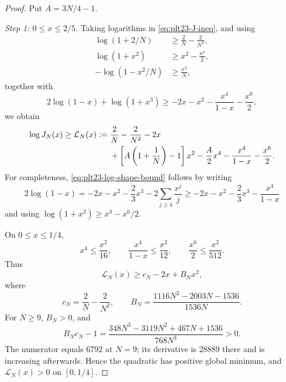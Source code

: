 \documentclass[11pt]{article}
\numberwithin{equation}{section}
\begin{document}
\begin{proof}
  Put $A=3N/4-1$.

  \smallskip
  \noindent\emph{Step 1: $0\le x\le2/5$.}
  Taking logarithms in \eqref{eq:plt23-J-ineq}, and using
  \begin{align*}
    \log(1+2/N)&\ge\frac{2}{N}-\frac{2}{N^2},\\
    \log(1+x^2)&\ge x^2-\frac{x^4}{2},\\
    -\log(1-x^2/N)&\ge\frac{x^2}{N},
  \end{align*}
  together with
  \begin{equation}\label{eq:plt23-log-shape-bound}
    2\log(1-x)+\log(1+x^3)
    \ge-2x-x^2-\frac{x^4}{1-x}-\frac{x^6}{2},
  \end{equation}
  we obtain
  \begin{align}
    \log J_N(x)\ge\mathcal L_N(x):={}&
    \frac{2}{N}-\frac{2}{N^2}-2x \notag\\
    &+\left[A\left(1+\frac{1}{N}\right)-1\right]x^2
    -\frac {A}{2}x^4-\frac{x^4}{1-x}-\frac{x^6}{2}. \label{eq:plt23-L-N-def}
  \end{align}
  For completeness, \eqref{eq:plt23-log-shape-bound} follows by writing
  \[
    2\log(1-x)
    =-2x-x^2-\frac{2}{3}x^3-2\sum_{j\ge4}\frac{x^j}{j}
    \ge-2x-x^2-\frac{2}{3}x^3-\frac{x^4}{1-x}
  \]
  and using $\log(1+x^3)\ge x^3-x^6/2$.

  On $0\le x\le1/4$,
  \[
    x^4\le\frac{x^2}{16},
    \qquad
    \frac{x^4}{1-x}\le\frac{x^2}{12},
    \qquad
    \frac{x^6}{2}\le\frac{x^2}{512}.
  \]
  Thus
  \[
    \mathcal L_N(x)\ge c_N-2x+B_Nx^2,
  \]
  where
  \[
    c_N=\frac{2}{N}-\frac{2}{N^2},
    \qquad
    B_N=\frac{1116N^2-2003N-1536}{1536N}.
  \]
  For $N\ge9$, $B_N>0$, and
  \begin{equation}\label{eq:plt23-discriminant-check}
    B_Nc_N-1
    =\frac{348N^3-3119N^2+467N+1536}{768N^3}>0.
  \end{equation}
  The numerator equals $6792$ at $N=9$; its derivative is $28889$ there and is increasing afterwards.
  Hence the quadratic has positive global minimum, and $\mathcal L_N(x)>0$ on $[0,1/4]$.


\end{proof}
\end{document}
